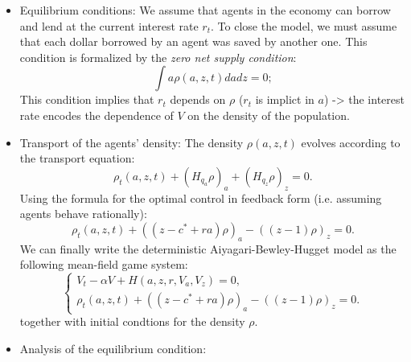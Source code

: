 \documentclass{article}
\begin{document}
\begin{itemize}
    \item Equilibrium conditions: We assume that agents in the economy can borrow and lend at the current
    interest rate $r_t$. To close the model, we must assume that each dollar borrowed by an agent was
    saved by another one. This condition is formalized by the {\it zero net supply condition}:
    $$
    \int a \rho(a,z,t) da dz = 0;
    $$
    This condition implies that $r_t$ depends on $\rho$ ($r_t$ is implict in $a$) -> the interest rate encodes
    the dependence of $V$ on the density of the population.

    \item Transport of the agents' density: The density $\rho(a,z,t)$ evolves according to
    the transport equation:
    $$
    \rho_t (a,z,t) + (H_{q_a} \rho)_a + (H_{q_z} \rho)_z = 0.
    $$
    Using the formula for the optimal control in feedback form (i.e. assuming agents behave rationally):
    $$
    \rho_t(a,z,t) + (( z - c^* + ra) \rho)_a - ( (z - 1) \rho )_z = 0.
    $$
    We can finally write the deterministic Aiyagari-Bewley-Hugget model as the following mean-field game
    system:
    \begin{equation}
        \begin{cases}
            V_t - \alpha V + H(a,z,r,V_a,V_z) = 0,\\
            \rho_t (a,z,t) + (( z - c^* + ra) \rho)_a - ((z-1) \rho)_z = 0.
        \end{cases}
    \end{equation}
    together with initial condtions for the density $\rho$.

    \item Analysis of the equilibrium condition: 
\end{itemize}
\end{document}
